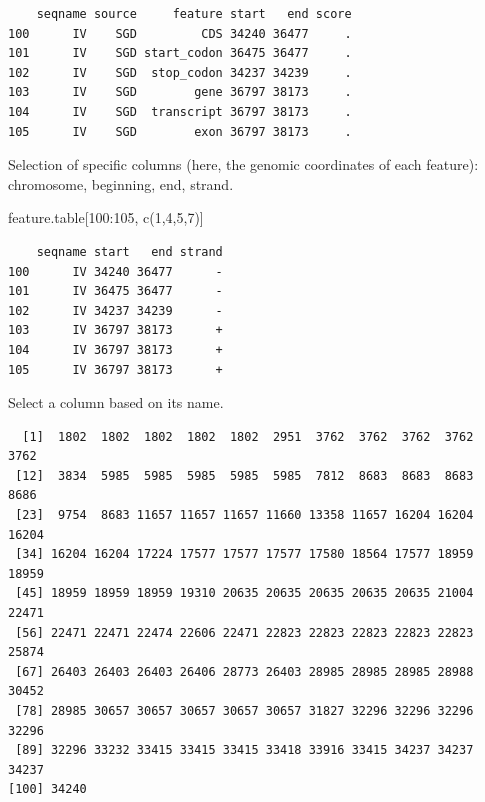 \documentclass[]{article}
\newenvironment{Shaded}{\begin{snugshade}}{\end{snugshade}}
\newcommand{\KeywordTok}[1]{\textcolor[rgb]{0.94,0.87,0.69}{#1}}
\newcommand{\DataTypeTok}[1]{\textcolor[rgb]{0.87,0.87,0.75}{#1}}
\newcommand{\DecValTok}[1]{\textcolor[rgb]{0.86,0.86,0.80}{#1}}
\newcommand{\OperatorTok}[1]{\textcolor[rgb]{0.94,0.94,0.82}{#1}}
\newcommand{\NormalTok}[1]{\textcolor[rgb]{0.80,0.80,0.80}{#1}}
\begin{document}
\begin{verbatim}
    seqname source     feature start   end score
100      IV    SGD         CDS 34240 36477     .
101      IV    SGD start_codon 36475 36477     .
102      IV    SGD  stop_codon 34237 34239     .
103      IV    SGD        gene 36797 38173     .
104      IV    SGD  transcript 36797 38173     .
105      IV    SGD        exon 36797 38173     .
\end{verbatim}

Selection of specific columns (here, the genomic coordinates of each
feature): chromosome, beginning, end, strand.

\begin{Shaded}
\begin{Highlighting}[]
\NormalTok{feature.table[}\DecValTok{100}\OperatorTok{:}\DecValTok{105}\NormalTok{, }\KeywordTok{c}\NormalTok{(}\DecValTok{1}\NormalTok{,}\DecValTok{4}\NormalTok{,}\DecValTok{5}\NormalTok{,}\DecValTok{7}\NormalTok{)]}
\end{Highlighting}
\end{Shaded}

\begin{verbatim}
    seqname start   end strand
100      IV 34240 36477      -
101      IV 36475 36477      -
102      IV 34237 34239      -
103      IV 36797 38173      +
104      IV 36797 38173      +
105      IV 36797 38173      +
\end{verbatim}

Select a column based on its name.

\begin{Shaded}
\end{Shaded}

\begin{verbatim}
  [1]  1802  1802  1802  1802  1802  2951  3762  3762  3762  3762  3762
 [12]  3834  5985  5985  5985  5985  5985  7812  8683  8683  8683  8686
 [23]  9754  8683 11657 11657 11657 11660 13358 11657 16204 16204 16204
 [34] 16204 16204 17224 17577 17577 17577 17580 18564 17577 18959 18959
 [45] 18959 18959 18959 19310 20635 20635 20635 20635 20635 21004 22471
 [56] 22471 22471 22474 22606 22471 22823 22823 22823 22823 22823 25874
 [67] 26403 26403 26403 26406 28773 26403 28985 28985 28985 28988 30452
 [78] 28985 30657 30657 30657 30657 30657 31827 32296 32296 32296 32296
 [89] 32296 33232 33415 33415 33415 33418 33916 33415 34237 34237 34237
[100] 34240
\end{verbatim}
\end{document}
